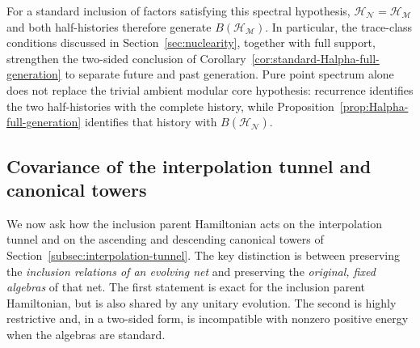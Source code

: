 \documentclass[a4paper,11pt]{article}
\theoremstyle{definition}
\newcommand{\mN}{\mathcal{N}}
\newcommand{\mH}{\mathcal{H}}
\newcommand{\mM}{\mathcal{M}}
\begin{document}
For a standard inclusion of factors satisfying this spectral hypothesis,
$\mH_{\mN}=\mH_{\mM}$ and both half-histories therefore generate
$B(\mH_{\mM})$. In particular, the trace-class conditions discussed in
Section~\ref{sec:nuclearity}, together with full support, strengthen the
two-sided conclusion of Corollary~\ref{cor:standard-Halpha-full-generation}
to separate future and past generation. Pure point spectrum alone
does not replace the trivial ambient modular core hypothesis: recurrence
identifies the two half-histories with the complete history, while
Proposition~\ref{prop:Halpha-full-generation} identifies that history
with $B(\mH_{\mN})$.

\subsection{Covariance of the interpolation tunnel and canonical towers}
\label{subsec:Q-tower-covariance}

We now ask how the inclusion parent Hamiltonian acts on the
interpolation tunnel and on the ascending and descending canonical
towers of Section~\ref{subsec:interpolation-tunnel}. The key distinction
is between preserving the \emph{inclusion relations of an evolving net}
and preserving the \emph{original, fixed algebras} of that net.
The first statement is exact for the inclusion parent Hamiltonian,
but is also shared by any unitary evolution. The second is highly
restrictive and, in a two-sided form, is incompatible with nonzero
positive energy when the algebras are standard.
\end{document}
